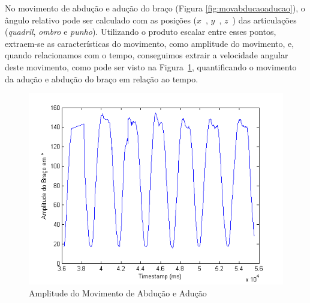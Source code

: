 % 
% 

No movimento de abdução e adução do braço (Figura \ref{fig:movabducaoaducao}), o ângulo relativo pode ser calculado com as posições ($ x $\ ,  $ y $\ , $ z $\ ) das articulações (\textit{quadril}, \textit{ombro} e \textit{punho}). Utilizando o produto escalar entre esses pontos, extraem-se as características do movimento, como amplitude do movimento, e, quando relacionamos com o tempo, conseguimos extrair a velocidade angular deste movimento, como pode ser visto na Figura~\ref{img:amplitude_braco}, quantificando o movimento da adução e abdução do braço em relação ao tempo.


\begin{figure}[!htb]
     \centering
     \includegraphics[width=1\textwidth]{./img/amplitude-braco.png}
     \caption{Amplitude do Movimento de Abdução e Adução}
     \label{img:amplitude_braco}
\end{figure}

